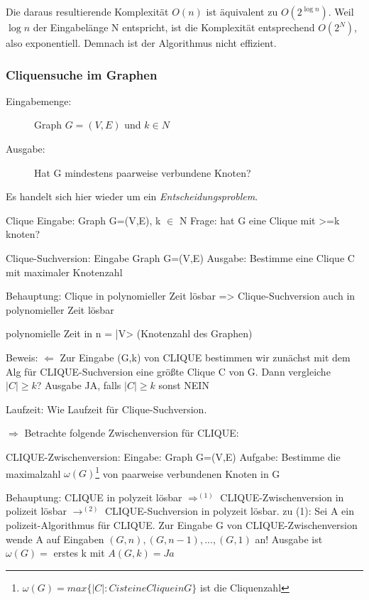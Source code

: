 \documentclass{article} %
\begin{document}
Die daraus resultierende Komplexität $O(n)$ ist äquivalent zu $O(2^{\log n})$.
Weil $\log n$ der Eingabelänge N entspricht, ist die Komplexität entsprechend $O(2^N)$, also exponentiell.
Demnach ist der Algorithmus nicht effizient.

\subsubsection{Cliquensuche im Graphen}
\begin{description}
	\item[Eingabemenge:] Graph $G= (V,E)$ und $k \in N$
	\item[Ausgabe:] Hat G mindestens paarweise verbundene Knoten?
\end{description}
Es handelt sich hier wieder um ein \emph{Entscheidungsproblem}.


\begin{framed}
Clique
Eingabe: Graph G=(V,E), k $\in$ N
Frage: hat G eine Clique mit >=k knoten?
\end{framed}
\begin{framed}
Clique-Suchversion:
Eingabe Graph G=(V,E)
Ausgabe: Bestimme eine Clique C mit maximaler Knotenzahl
\end{framed}
Behauptung: Clique in polynomieller Zeit lösbar => Clique-Suchversion auch in polynomieller Zeit lösbar

polynomielle Zeit in n = |V> (Knotenzahl des Graphen)

Beweis: 
$\Leftarrow$ 
Zur Eingabe (G,k) von CLIQUE  bestimmen wir zunächst mit dem Alg für CLIQUE-Suchversion eine größte Clique C von G.
Dann vergleiche $|C| \geq k$? Ausgabe JA, falls $|C| \geq k$ sonst NEIN

Laufzeit: Wie Laufzeit für Clique-Suchversion.

$\Rightarrow$
Betrachte folgende Zwischenversion für CLIQUE:
\begin{framed}
CLIQUE-Zwischenversion:
Eingabe: Graph G=(V,E)
Aufgabe: Bestimme die maximalzahl $\omega (G)$\footnote{$\omega(G) = max \{|C|: C ist eine Clique in G\}$ ist die Cliquenzahl} von paarweise verbundenen Knoten in G
\end{framed}

Behauptung: CLIQUE in polyzeit lösbar $\Rightarrow^{(1)}$ CLIQUE-Zwischenversion in polizeit lösbar $\rightarrow^{(2)}$ CLIQUE-Suchversion in polyzeit lösbar.
zu (1): Sei A ein polizeit-Algorithmus für CLIQUE.
Zur Eingabe G von CLIQUE-Zwischenversion wende A auf Eingaben $(G,n), (G,n-1),...,(G,1)$ an!
Ausgabe ist $\omega (G) =$ erstes k mit $A(G,k) = Ja$
\end{document}

